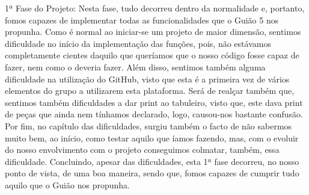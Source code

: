 1ª Fase do Projeto\+: Nesta fase, tudo decorreu dentro da normalidade e, portanto, fomos capazes de implementar todas as funcionalidades que o Guião 5 nos propunha. Como é normal ao iniciar-\/se um projeto de maior dimensão, sentimos dificuldade no início da implementação das funções, pois, não estávamos completamente cientes daquilo que queríamos que o nosso código fosse capaz de fazer, nem como o deveria fazer. Além disso, sentimos também alguma dificuldade na utilização do Git\+Hub, visto que esta é a primeira vez de vários elementos do grupo a utilizarem esta plataforma. Será de realçar também que, sentimos também dificuldades a dar print ao tabuleiro, visto que, este dava print de peças que ainda nem tínhamos declarado, logo, causou-\/nos bastante confusão. Por fim, no capítulo das dificuldades, surgiu também o facto de não sabermos muito bem, ao início, como testar aquilo que íamos fazendo, mas, com o evoluir do nosso envolvimento com o projeto conseguimos colmatar, também, essa dificuldade. Concluindo, apesar das dificuldades, esta 1ª fase decorreu, no nosso ponto de vista, de uma boa maneira, sendo que, fomos capazes de cumprir tudo aquilo que o Guião nos propunha. 